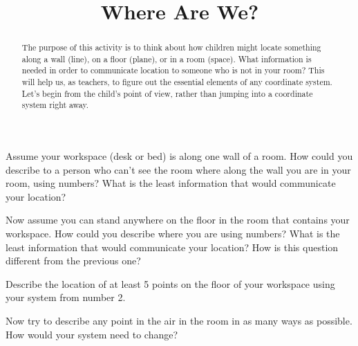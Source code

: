 \documentclass[nooutcomes] {ximera}
\title{Where Are We?}
\begin{document}
\begin{abstract}
The purpose of this activity is to think about how children might locate something along a wall (line), on a floor (plane), or in a room (space).  What information is needed in order to communicate location to someone who is not in your room?  This will help us, as teachers, to figure out the essential elements of any coordinate system.  Let's begin from the child's point of view, rather than jumping into a coordinate system right away.
\end{abstract}
\maketitle



\begin{problem}

Assume your workspace (desk or bed) is along one wall of a room.  How could you describe to a person who can't see the room where along the wall you are in your room, using numbers?  What is the least information that would communicate your location? 

\end{problem}

\begin{problem}
Now assume you can stand anywhere on the floor in the room that contains your workspace.  How could you describe where you are using numbers?  What is the least information that would communicate your location? How is this question different from the previous one?

\end{problem}



\begin{problem}
Describe the location of at least 5 points on the floor of your workspace using your system from number 2.
\end{problem}

\begin{problem}
Now try to describe any point in the air in the room in as many ways as possible. How would your system need to change?
\end{problem}
\end{document}
